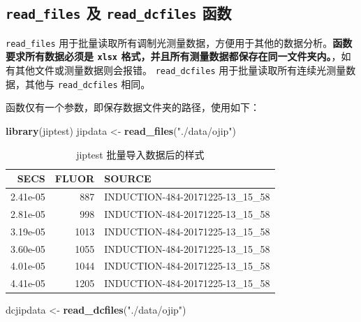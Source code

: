 \documentclass[]{krantz}
\makeatletter
\newenvironment{Shaded}{\begin{snugshade}}{\end{snugshade}}
\newcommand{\KeywordTok}[1]{\textcolor[rgb]{0.13,0.29,0.53}{\textbf{#1}}}
\newcommand{\StringTok}[1]{\textcolor[rgb]{0.31,0.60,0.02}{#1}}
\newcommand{\NormalTok}[1]{#1}
\newenvironment{kframe}{%
\medskip{}
\setlength{\fboxsep}{.8em}
 \def\at@end@of@kframe{}%
 \ifinner\ifhmode%
  \def\at@end@of@kframe{\end{minipage}}%
  \begin{minipage}{\columnwidth}%
 \fi\fi%
 \def\FrameCommand##1{\hskip\@totalleftmargin \hskip-\fboxsep
 \colorbox{shadecolor}{##1}\hskip-\fboxsep
     \hskip-\linewidth \hskip-\@totalleftmargin \hskip\columnwidth}%
 \MakeFramed {\advance\hsize-\width
   \@totalleftmargin\z@ \linewidth\hsize
   \@setminipage}}%
 {\par\unskip\endMakeFramed%
 \at@end@of@kframe}
\renewenvironment{Shaded}{\begin{kframe}}{\end{kframe}}
\theoremstyle{definition}
\theoremstyle{definition}
\theoremstyle{definition}
\theoremstyle{remark}
\makeatother
\begin{document}
\subsection{\texorpdfstring{\texttt{read\_files} 及
\texttt{read\_dcfiles}
函数}{read\_files 及 read\_dcfiles 函数}}\label{read_files--read_dcfiles-}

\texttt{read\_files}
用于批量读取所有调制光测量数据，方便用于其他的数据分析。\textbf{函数要求所有数据必须是
\texttt{xlsx}
格式，并且所有测量数据都保存在同一文件夹内。}，如有其他文件或测量数据则会报错。
\texttt{read\_dcfiles} 用于批量读取所有连续光测量数据，其他与
\texttt{read\_dcfiles} 相同。

函数仅有一个参数，即保存数据文件夹的路径，使用如下：

\begin{Shaded}
\begin{Highlighting}[]
\KeywordTok{library}\NormalTok{(jiptest)}
\NormalTok{jipdata <-}\StringTok{ }\KeywordTok{read_files}\NormalTok{(}\StringTok{"./data/ojip"}\NormalTok{)}
\end{Highlighting}
\end{Shaded}

\begin{table}[t]

\caption{\label{tab:unnamed-chunk-25}jiptest 批量导入数据后的样式}
\centering
\begin{tabular}{rrl}
\toprule
SECS & FLUOR & SOURCE\\
\midrule
2.41e-05 & 887 & INDUCTION-484-20171225-13\_15\_58\\
2.81e-05 & 998 & INDUCTION-484-20171225-13\_15\_58\\
3.19e-05 & 1013 & INDUCTION-484-20171225-13\_15\_58\\
3.60e-05 & 1055 & INDUCTION-484-20171225-13\_15\_58\\
4.01e-05 & 1044 & INDUCTION-484-20171225-13\_15\_58\\
\addlinespace
4.41e-05 & 1205 & INDUCTION-484-20171225-13\_15\_58\\
\bottomrule
\end{tabular}
\end{table}

\begin{Shaded}
\begin{Highlighting}[]
\NormalTok{dcjipdata <-}\StringTok{ }\KeywordTok{read_dcfiles}\NormalTok{(}\StringTok{"./data/ojip"}\NormalTok{)}
\end{Highlighting}
\end{Shaded}
\end{document}
